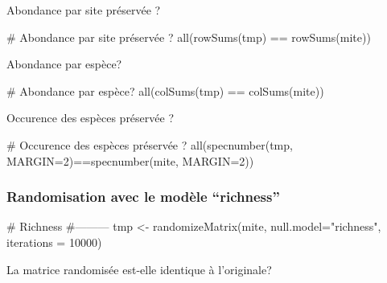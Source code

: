 \documentclass[]{article}
\newenvironment{Shaded}{\begin{snugshade}}{\end{snugshade}}
\newcommand{\KeywordTok}[1]{\textcolor[rgb]{0.94,0.87,0.69}{#1}}
\newcommand{\DataTypeTok}[1]{\textcolor[rgb]{0.87,0.87,0.75}{#1}}
\newcommand{\DecValTok}[1]{\textcolor[rgb]{0.86,0.86,0.80}{#1}}
\newcommand{\StringTok}[1]{\textcolor[rgb]{0.80,0.58,0.58}{#1}}
\newcommand{\CommentTok}[1]{\textcolor[rgb]{0.50,0.62,0.50}{#1}}
\newcommand{\OperatorTok}[1]{\textcolor[rgb]{0.94,0.94,0.82}{#1}}
\newcommand{\NormalTok}[1]{\textcolor[rgb]{0.80,0.80,0.80}{#1}}
\begin{document}
Abondance par site préservée ?

\begin{Shaded}
\begin{Highlighting}[]
\CommentTok{# Abondance par site préservée ?}
\KeywordTok{all}\NormalTok{(}\KeywordTok{rowSums}\NormalTok{(tmp) }\OperatorTok{==}\StringTok{ }\KeywordTok{rowSums}\NormalTok{(mite))}
\end{Highlighting}
\end{Shaded}

Abondance par espèce?

\begin{Shaded}
\begin{Highlighting}[]
\CommentTok{# Abondance par espèce?}
\KeywordTok{all}\NormalTok{(}\KeywordTok{colSums}\NormalTok{(tmp) }\OperatorTok{==}\StringTok{ }\KeywordTok{colSums}\NormalTok{(mite))}
\end{Highlighting}
\end{Shaded}

Occurence des espèces préservée ?

\begin{Shaded}
\begin{Highlighting}[]
\CommentTok{# Occurence des espèces préservée ?}
\KeywordTok{all}\NormalTok{(}\KeywordTok{specnumber}\NormalTok{(tmp, }\DataTypeTok{MARGIN=}\DecValTok{2}\NormalTok{)}\OperatorTok{==}\KeywordTok{specnumber}\NormalTok{(mite, }\DataTypeTok{MARGIN=}\DecValTok{2}\NormalTok{))}
\end{Highlighting}
\end{Shaded}

\subsubsection{\texorpdfstring{Randomisation avec le modèle
``richness''}{Randomisation avec le modèle richness}}\label{randomisation-avec-le-modele-richness}

\begin{Shaded}
\begin{Highlighting}[]
\CommentTok{# Richness}
\CommentTok{#---------}
\NormalTok{tmp <-}\StringTok{ }\KeywordTok{randomizeMatrix}\NormalTok{(mite, }\DataTypeTok{null.model=}\StringTok{"richness"}\NormalTok{, }\DataTypeTok{iterations =} \DecValTok{10000}\NormalTok{)}
\end{Highlighting}
\end{Shaded}

La matrice randomisée est-elle identique à l'originale?
\end{document}
